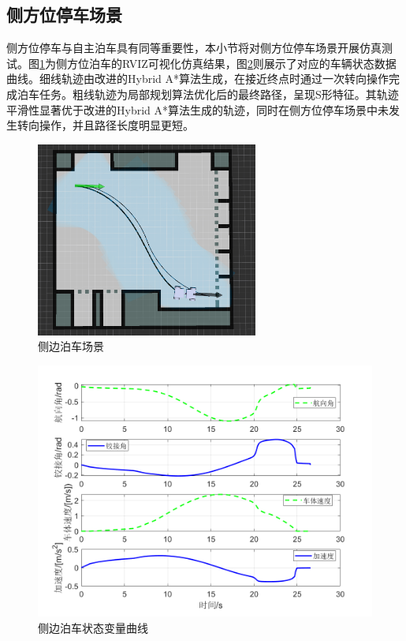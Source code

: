 \documentclass[master,academic]{ysuthesis} %
\begin{document}
		\subsection{侧方位停车场景}
		侧方位停车与自主泊车具有同等重要性，本小节将对侧方位停车场景开展仿真测试。图\ref{fig:cebianboche}为侧方位泊车的RVIZ可视化仿真结果，图\ref{fig:datacebianstate}则展示了对应的车辆状态数据曲线。细线轨迹由改进的Hybrid A*算法生成，在接近终点时通过一次转向操作完成泊车任务。粗线轨迹为局部规划算法优化后的最终路径，呈现S形特征。其轨迹平滑性显著优于改进的Hybrid A*算法生成的轨迹，同时在侧方位停车场景中未发生转向操作，并且路径长度明显更短。
		\begin{figure}[H]
			\centering
			\includegraphics[width=0.65\textwidth]{cebianboche.png}
			\caption{侧边泊车场景}
			\label{fig:cebianboche}
		\end{figure}

		\begin{figure}[H]
			\centering
			\includegraphics[width=1\textwidth]{datacebianstate.png}
			\caption{侧边泊车状态变量曲线}
			\label{fig:datacebianstate}
		\end{figure}
\end{document}
